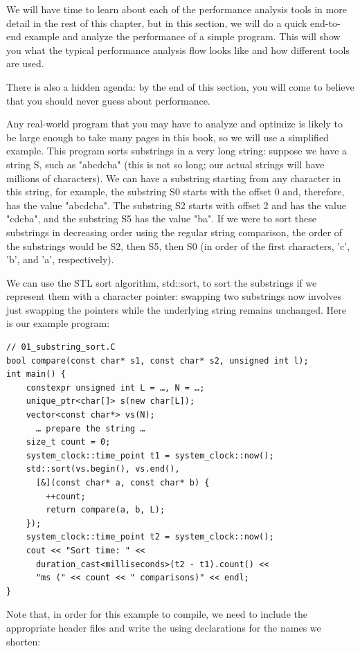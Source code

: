 We will have time to learn about each of the performance analysis tools in more detail in the rest of this chapter, but in this section, we will do a quick end-to-end example and analyze the performance of a simple program. This will show you what the typical performance analysis flow looks like and how different tools are used.

There is also a hidden agenda: by the end of this section, you will come to believe that you should never guess about performance.

Any real-world program that you may have to analyze and optimize is likely to be large enough to take many pages in this book, so we will use a simplified example. This program sorts substrings in a very long string: suppose we have a string S, such as "abcdcba" (this is not so long; our actual strings will have millions of characters). We can have a substring starting from any character in this string, for example, the substring S0 starts with the offset 0 and, therefore, has the value "abcdcba". The substring S2 starts with offset 2 and has the value "cdcba", and the substring S5 has the value "ba". If we were to sort these substrings in decreasing order using the regular string comparison, the order of the substrings would be S2, then S5, then S0 (in order of the first characters, 'c', 'b', and 'a', respectively).

We can use the STL sort algorithm, std::sort, to sort the substrings if we represent them with a character pointer: swapping two substrings now involves just swapping the pointers while the underlying string remains unchanged. Here is our example program:

\begin{lstlisting}[style=styleCXX]
// 01_substring_sort.C
bool compare(const char* s1, const char* s2, unsigned int l);
int main() {
	constexpr unsigned int L = …, N = …;
	unique_ptr<char[]> s(new char[L]);
	vector<const char*> vs(N);
	  … prepare the string …
	size_t count = 0;
	system_clock::time_point t1 = system_clock::now();
	std::sort(vs.begin(), vs.end(),
	  [&](const char* a, const char* b) {
		++count;
		return compare(a, b, L);
	});
	system_clock::time_point t2 = system_clock::now();
	cout << "Sort time: " <<
	  duration_cast<milliseconds>(t2 - t1).count() <<
	  "ms (" << count << " comparisons)" << endl;
}
\end{lstlisting}

Note that, in order for this example to compile, we need to include the appropriate header files and write the using declarations for the names we shorten:

